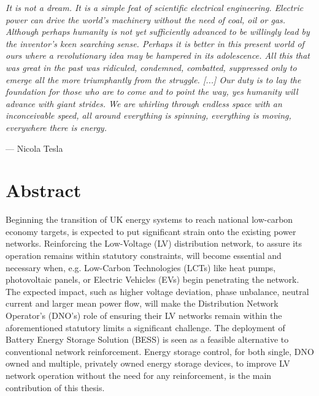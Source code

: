 
\epigraph{\textit{It is not a dream. It is a simple feat of scientific electrical engineering. Electric power can drive the world's machinery without the need of coal, oil or gas. Although perhaps humanity is not yet sufficiently advanced to be willingly lead by the inventor's keen searching sense. Perhaps it is better in this present world of ours where a revolutionary idea may be hampered in its adolescence. All this that was great in the past was ridiculed, condemned, combatted, suppressed only to emerge all the more triumphantly from the struggle. [...] Our duty is to lay the foundation for those who are to come and to point the way, yes humanity will advance with giant strides. We are whirling through endless space with an inconceivable speed, all around everything is spinning, everything is moving, everywhere there is energy.}}{--- Nicola Tesla}


\chapter*{Abstract}




Beginning the transition of UK energy systems to reach national low-carbon\linebreak
economy targets, is expected to put significant strain onto the existing power\linebreak
networks. Reinforcing the Low-Voltage (LV) distribution network, to assure its\linebreak
operation remains within statutory constraints, will become essential and necessary\linebreak
when, e.g. Low-Carbon Technologies (LCTs) like heat pumps, photovoltaic panels, or\linebreak
Electric Vehicles (EVs) begin penetrating the network. The expected impact,\linebreak
such as higher voltage deviation, phase unbalance, neutral current and larger\linebreak
mean power flow, will make the Distribution Network Operator's (DNO's) role of\linebreak
ensuring their LV networks remain within the aforementioned statutory limits \linebreak
a significant challenge. The deployment of Battery Energy Storage Solution \linebreak
(BESS) is seen as a feasible alternative to conventional network reinforcement.\linebreak
Energy storage control, for both single, DNO owned and multiple, privately owned\linebreak
energy storage devices, to improve LV network operation without the need for any\linebreak
reinforcement, is the main contribution of this thesis.

